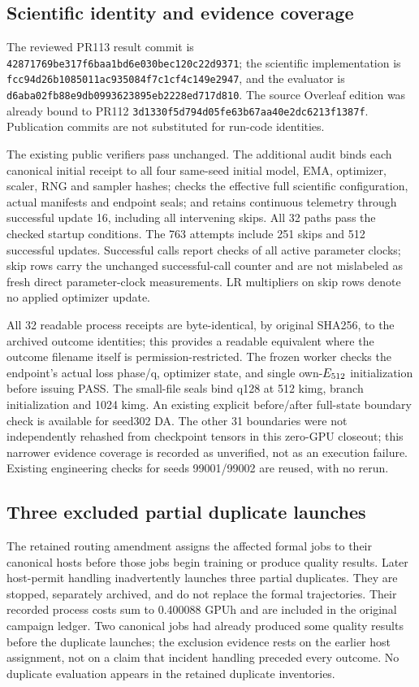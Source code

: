 \subsection{Scientific identity and evidence coverage}
\label{app:q128audit}
The reviewed PR113 result commit is \texttt{42871769be317f6baa1bd6e030bec120c22d9371}; the scientific implementation is \texttt{fcc94d26b1085011ac935084f7c1cf4c149e2947}, and the evaluator is \texttt{d6aba02fb88e9db0993623895eb2228ed717d810}. The source Overleaf edition was already bound to PR112 \texttt{3d1330f5d794d05fe63b67aa40e2dc6213f1387f}. Publication commits are not substituted for run-code identities.

The existing public verifiers pass unchanged. The additional audit binds each canonical initial receipt to all four same-seed initial model, EMA, optimizer, scaler, RNG and sampler hashes; checks the effective full scientific configuration, actual manifests and endpoint seals; and retains continuous telemetry through successful update 16, including all intervening skips. All 32 paths pass the checked startup conditions. The 763 attempts include 251 skips and 512 successful updates. Successful calls report checks of all active parameter clocks; skip rows carry the unchanged successful-call counter and are not mislabeled as fresh direct parameter-clock measurements. LR multipliers on skip rows denote no applied optimizer update.

All 32 readable process receipts are byte-identical, by original SHA256, to the archived outcome identities; this provides a readable equivalent where the outcome filename itself is permission-restricted. The frozen worker checks the endpoint's actual loss phase/q, optimizer state, and single own-$E_{512}$ initialization before issuing PASS. The small-file seals bind q128 at 512 kimg, branch initialization and 1024 kimg. An existing explicit before/after full-state boundary check is available for seed302 DA. The other 31 boundaries were not independently rehashed from checkpoint tensors in this zero-GPU closeout; this narrower evidence coverage is recorded as unverified, not as an execution failure. Existing engineering checks for seeds 99001/99002 are reused, with no rerun.

\subsection{Three excluded partial duplicate launches}
The retained routing amendment assigns the affected formal jobs to their canonical hosts before those jobs begin training or produce quality results. Later host-permit handling inadvertently launches three partial duplicates. They are stopped, separately archived, and do not replace the formal trajectories. Their recorded process costs sum to 0.400088 GPUh and are included in the original campaign ledger. Two canonical jobs had already produced some quality results before the duplicate launches; the exclusion evidence rests on the earlier host assignment, not on a claim that incident handling preceded every outcome. No duplicate evaluation appears in the retained duplicate inventories.

